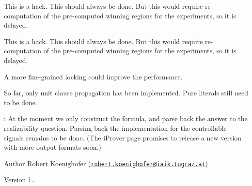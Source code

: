 
\begin{DoxyRefList}
\item[\label{todo__todo000001}%
\hypertarget{todo__todo000001}{}%
Member \hyperlink{classAIG2CNF_a3f4358961404803c1be6b73f5aada4ce}{A\-I\-G2\-C\-N\-F\-:\-:is\-True\-In\-Trans} ()]This is a hack. This should always be done. But this would require re-\/computation of the pre-\/computed winning regions for the experiments, so it is delayed. 
\item[\label{todo__todo000002}%
\hypertarget{todo__todo000002}{}%
Member \hyperlink{classAIG2CNF_a0a46853e81b9c2be9dc9dab2d080355d}{A\-I\-G2\-C\-N\-F\-:\-:true\-\_\-in\-\_\-trans\-\_\-} ]This is a hack. This should always be done. But this would require re-\/computation of the pre-\/computed winning regions for the experiments, so it is delayed.  
\item[\label{todo__todo000012}%
\hypertarget{todo__todo000012}{}%
Member \hyperlink{classClauseExplorerSAT_a674651f8fbf9ed93264ce3369bd5332b}{Clause\-Explorer\-S\-A\-T\-:\-:new\-\_\-info\-\_\-lock\-\_\-} ]A more fine-\/grained locking could improve the performance.  
\item[\label{todo__todo000003}%
\hypertarget{todo__todo000003}{}%
Member \hyperlink{classCNF_ad7b181b3dbe40f751326c4722d0af84a}{C\-N\-F\-:\-:do\-Pure\-And\-Unit} (const vector$<$ int $>$ \&keep)]So far, only unit clause propagation has been implemented. Pure literals still need to be done. 
\item[\label{todo__todo000004}%
\hypertarget{todo__todo000004}{}%
Class \hyperlink{classEPRSynthesizer}{E\-P\-R\-Synthesizer} ]\-: At the moment we only construct the formula, and parse back the answer to the realizability question. Parsing back the implementation for the controllable signals remains to be done. (The i\-Prover page promises to release a new version with more output formats soon.) \begin{DoxyAuthor}{Author}
Robert Koenighofer (\href{mailto:robert.koenighofer@iaik.tugraz.at}{\tt robert.\-koenighofer@iaik.\-tugraz.\-at}) 
\end{DoxyAuthor}
\begin{DoxyVersion}{Version}
1..  
\end{DoxyVersion}


\end{DoxyRefList}
